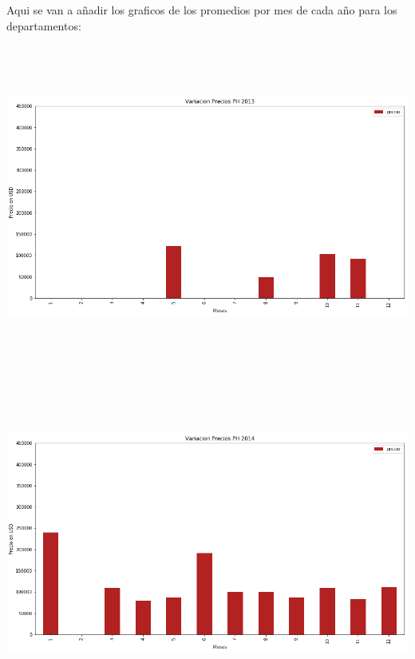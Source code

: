 \documentclass[a4paper, 10pt]{article}
\begin{document}
      Aqui se van a añadir los graficos de los promedios por mes de cada año para los departamentos:
      \begin{center}
            \includegraphics[width=6in, height=4.2in]{images/vPH2013}
      \end{center}
      \begin{center}
            \includegraphics[width=6in, height=4.2in]{images/vPH2014}
      \end{center}
\end{document}
